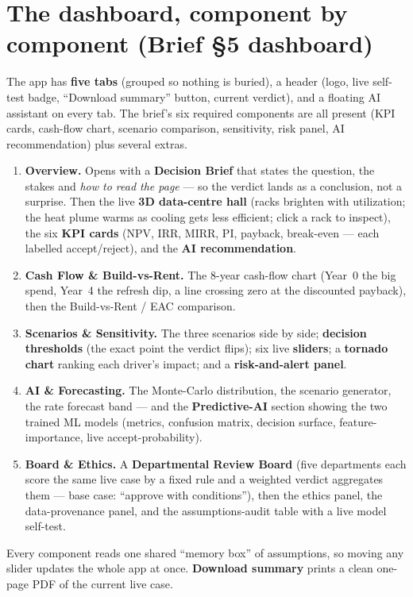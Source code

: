 \documentclass[11pt,a4paper]{article}
\newcommand{\term}[1]{\textcolor{tvblue}{\textbf{#1}}}
\begin{document}
\section{The dashboard, component by component (Brief \S5 dashboard)}
The app has \textbf{five tabs} (grouped so nothing is buried), a header (logo, live self-test badge,
``Download summary'' button, current verdict), and a floating AI assistant on every tab. The brief's
six required components are all present (KPI cards, cash-flow chart, scenario comparison, sensitivity,
risk panel, AI recommendation) plus several extras.

\begin{enumerate}
  \item \textbf{Overview.} Opens with a \term{Decision Brief} that states the question, the stakes and
  \emph{how to read the page} --- so the verdict lands as a conclusion, not a surprise. Then the live
  \term{3D data-centre hall} (racks brighten with utilization; the heat plume warms as cooling gets
  less efficient; click a rack to inspect), the six \term{KPI cards} (NPV, IRR, MIRR, PI, payback,
  break-even --- each labelled accept/reject), and the \term{AI recommendation}.
  \item \textbf{Cash Flow \& Build-vs-Rent.} The 8-year cash-flow chart (Year~0 the big spend, Year~4
  the refresh dip, a line crossing zero at the discounted payback), then the Build-vs-Rent / EAC
  comparison.
  \item \textbf{Scenarios \& Sensitivity.} The three scenarios side by side; \term{decision
  thresholds} (the exact point the verdict flips); six live \term{sliders}; a \term{tornado chart}
  ranking each driver's impact; and a \term{risk-and-alert panel}.
  \item \textbf{AI \& Forecasting.} The Monte-Carlo distribution, the scenario generator, the rate
  forecast band --- and the \term{Predictive-AI} section showing the two trained ML models (metrics,
  confusion matrix, decision surface, feature-importance, live accept-probability).
  \item \textbf{Board \& Ethics.} A \term{Departmental Review Board} (five departments each score the
  same live case by a fixed rule and a weighted verdict aggregates them --- base case: ``approve with
  conditions''), then the ethics panel, the data-provenance panel, and the assumptions-audit table
  with a live model self-test.
\end{enumerate}
Every component reads one shared ``memory box'' of assumptions, so moving any slider updates the whole
app at once. \textbf{Download summary} prints a clean one-page PDF of the current live case.
\end{document}
